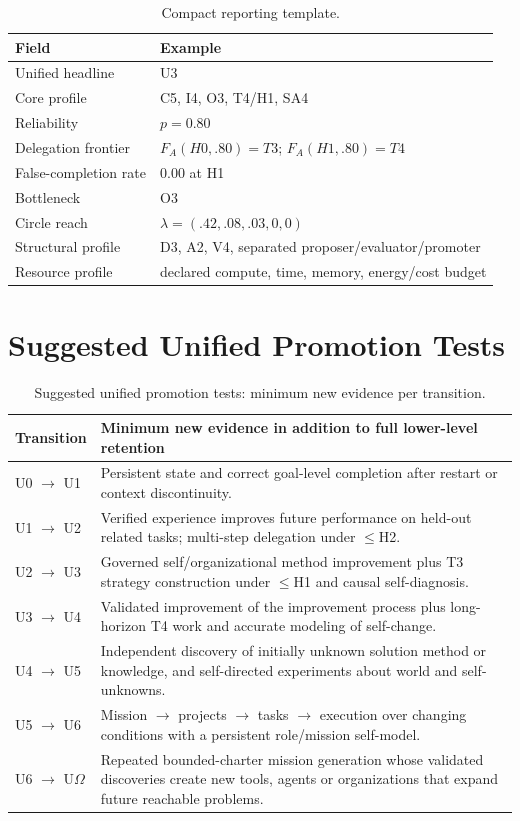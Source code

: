 \documentclass[11pt]{article}
\theoremstyle{definition}
\newcommand{\Om}{\ensuremath{\Omega}}
\begin{document}
\begin{table}[H]
\centering\small
\begin{tabularx}{\textwidth}{@{}lY@{}}
\toprule
Field & Example \\
\midrule
Unified headline & U3 \\
Core profile & C5, I4, O3, T4/H1, SA4 \\
Reliability & $p = 0.80$ \\
Delegation frontier & $F_A(H0,.80)=T3$; $F_A(H1,.80)=T4$ \\
False-completion rate \emph{} & 0.00 at H1 \\
Bottleneck & O3 \\
Circle reach & $\lambda = (.42,.08,.03,0,0)$ \\
Structural profile & D3, A2, V4, separated proposer/evaluator/promoter \\
Resource profile & declared compute, time, memory, energy/cost budget \\
\bottomrule
\end{tabularx}
\caption{Compact reporting template.}
\label{tab:template}
\end{table}

\section{Suggested Unified Promotion Tests}

\begin{table}[H]
\centering\small
\begin{tabularx}{\textwidth}{@{}lY@{}}
\toprule
Transition & Minimum new evidence in addition to full lower-level retention \\
\midrule
U0 $\to$ U1 & Persistent state and correct goal-level completion after restart or context discontinuity. \\
U1 $\to$ U2 & Verified experience improves future performance on held-out related tasks; multi-step delegation under $\le$H2. \\
U2 $\to$ U3 & Governed self/organizational method improvement plus T3 strategy construction under $\le$H1 and causal self-diagnosis. \\
U3 $\to$ U4 & Validated improvement of the improvement process plus long-horizon T4 work and accurate modeling of self-change. \\
U4 $\to$ U5 & Independent discovery of initially unknown solution method or knowledge, and self-directed experiments about world and self-unknowns. \\
U5 $\to$ U6 & Mission $\to$ projects $\to$ tasks $\to$ execution over changing conditions with a persistent role/mission self-model. \\
U6 $\to$ U\Om{} & Repeated bounded-charter mission generation whose validated discoveries create new tools, agents or organizations that expand future reachable problems. \\
\bottomrule
\end{tabularx}
\caption{Suggested unified promotion tests: minimum new evidence per transition.}
\label{tab:promotion}
\end{table}
\end{document}
